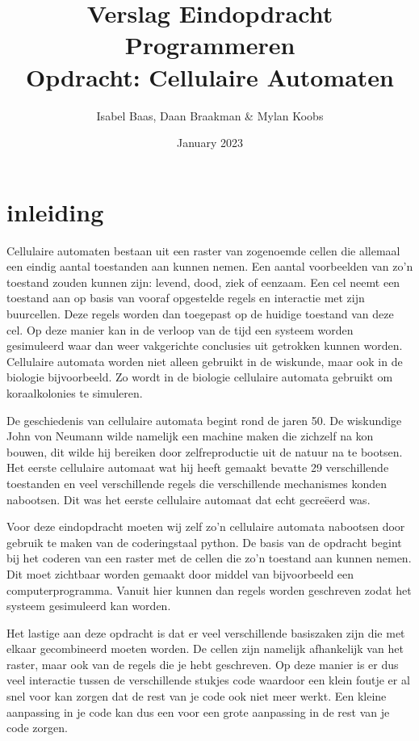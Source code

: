 \documentclass{article}
\title{%
    Verslag Eindopdracht Programmeren \\
    \large Opdracht: Cellulaire Automaten}
\author{Isabel Baas, Daan Braakman \& Mylan Koobs}
\date{January 2023}
\begin{document}
\maketitle
\newpage

\tableofcontents
\newpage
\section{inleiding}
Cellulaire automaten bestaan uit een raster van zogenoemde cellen die allemaal een eindig aantal toestanden aan kunnen nemen. Een aantal voorbeelden van zo'n toestand zouden kunnen zijn: levend, dood, ziek of eenzaam. Een cel neemt een toestand aan op basis van vooraf opgestelde regels en interactie met zijn buurcellen. Deze regels worden dan toegepast op de huidige toestand van deze cel. Op deze manier kan in de verloop van de tijd een systeem worden gesimuleerd waar dan weer vakgerichte conclusies uit getrokken kunnen worden. Cellulaire automata worden niet alleen gebruikt in de wiskunde, maar ook in de biologie bijvoorbeeld. Zo wordt in de biologie cellulaire automata gebruikt om koraalkolonies te simuleren. 

De geschiedenis van cellulaire automata begint rond de jaren 50. De wiskundige John von Neumann wilde namelijk een machine maken die zichzelf na kon bouwen, dit wilde hij bereiken door zelfreproductie uit de natuur na te bootsen. Het eerste cellulaire automaat wat hij heeft gemaakt bevatte 29 verschillende toestanden en veel verschillende regels die verschillende mechanismes konden nabootsen. Dit was het eerste cellulaire automaat dat echt gecreëerd was.

Voor deze eindopdracht moeten wij zelf zo'n cellulaire automata nabootsen door gebruik te maken van de coderingstaal python. De basis van de opdracht begint bij het coderen van een raster met de cellen die zo'n toestand aan kunnen nemen. Dit moet zichtbaar worden gemaakt door middel van bijvoorbeeld een computerprogramma. Vanuit hier kunnen dan regels worden geschreven zodat het systeem gesimuleerd kan worden. 

Het lastige aan deze opdracht is dat er veel verschillende basiszaken zijn die met elkaar gecombineerd moeten worden. De cellen zijn namelijk afhankelijk van het raster, maar ook van de regels die je hebt geschreven. Op deze manier is er dus veel interactie tussen de verschillende stukjes code waardoor een klein foutje er al snel voor kan zorgen dat de rest van je code ook niet meer werkt. Een kleine aanpassing in je code kan dus een voor een grote aanpassing in de rest van je code zorgen. 
\end{document}
